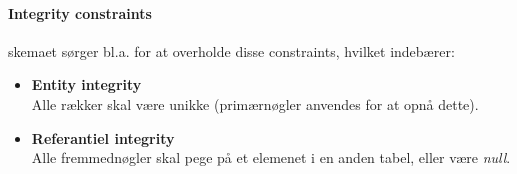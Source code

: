 \paragraph{Integrity constraints} skemaet sørger bl.a. for at overholde disse constraints, hvilket indebærer:

\begin{itemize}
	\item \textbf{Entity integrity}\\
	Alle rækker skal være unikke (primærnøgler anvendes for at opnå dette).
	\item \textbf{Referantiel integrity}\\
	Alle fremmednøgler skal pege på et elemenet i en anden tabel, eller være \textit{null}.
\end{itemize}



























